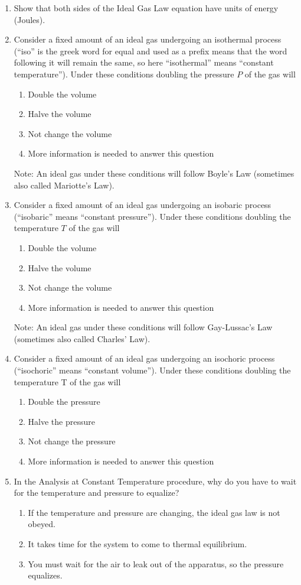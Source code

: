 \begin{enumerate}
\item Show that both sides of the Ideal Gas Law equation have units of energy (Joules).
\item Consider a fixed amount of an ideal gas undergoing an isothermal process (``iso'' is the greek word for equal and used as a prefix means that the word following it will remain the same, so here ``isothermal'' means ``constant temperature''). Under these conditions doubling the pressure $P$ of the gas will
  \begin{enumerate}
  \item Double the volume
  \item Halve the volume
  \item Not change the volume
  \item More information is needed to answer this question
  \end{enumerate}
  Note: An ideal gas under these conditions will follow Boyle's Law (sometimes also called Mariotte's Law).
\item Consider a fixed amount of an ideal gas undergoing an isobaric process (``isobaric'' means ``constant pressure''). Under these conditions doubling the temperature $T$ of the gas will
  \begin{enumerate}
  \item Double the volume
  \item Halve the volume
  \item Not change the volume
  \item More information is needed to answer this question
  \end{enumerate}
  Note: An ideal gas under these conditions will follow Gay-Lussac's Law (sometimes also called Charles' Law).
\item Consider a fixed amount of an ideal gas undergoing an isochoric process (``isochoric'' means ``constant volume''). Under these conditions doubling the temperature T of the gas will
  \begin{enumerate}
  \item Double the pressure
  \item Halve the pressure
  \item Not change the pressure
  \item More information is needed to answer this question
  \end{enumerate}
\item In the Analysis at Constant Temperature procedure, why do you have to wait for the temperature and pressure to equalize?
  \begin{enumerate}
  \item If the temperature and pressure are changing, the ideal gas law is not obeyed.
  \item It takes time for the system to come to thermal equilibrium.
  \item You must wait for the air to leak out of the apparatus, so the pressure equalizes.
  \end{enumerate}
\end{enumerate}
